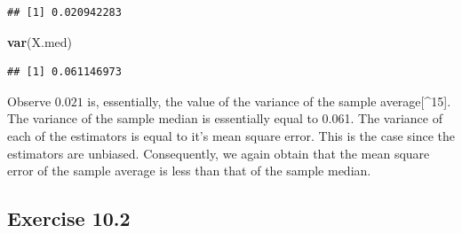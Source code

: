 \documentclass[]{krantz}
\makeatletter
\newenvironment{Shaded}{\begin{snugshade}}{\end{snugshade}}
\newcommand{\KeywordTok}[1]{\textcolor[rgb]{0.13,0.29,0.53}{\textbf{#1}}}
\newcommand{\NormalTok}[1]{#1}
\newenvironment{kframe}{%
\medskip{}
\setlength{\fboxsep}{.8em}
 \def\at@end@of@kframe{}%
 \ifinner\ifhmode%
  \def\at@end@of@kframe{\end{minipage}}%
  \begin{minipage}{\columnwidth}%
 \fi\fi%
 \def\FrameCommand##1{\hskip\@totalleftmargin \hskip-\fboxsep
 \colorbox{shadecolor}{##1}\hskip-\fboxsep
     \hskip-\linewidth \hskip-\@totalleftmargin \hskip\columnwidth}%
 \MakeFramed {\advance\hsize-\width
   \@totalleftmargin\z@ \linewidth\hsize
   \@setminipage}}%
 {\par\unskip\endMakeFramed%
 \at@end@of@kframe}
\renewenvironment{Shaded}{\begin{kframe}}{\end{kframe}}
\theoremstyle{definition}
\theoremstyle{definition}
\theoremstyle{definition}
\theoremstyle{remark}
\makeatother
\begin{document}
\begin{enumerate}
\begin{verbatim}
## [1] 0.020942283
\end{verbatim}

\begin{Shaded}
\begin{Highlighting}[]
\KeywordTok{var}\NormalTok{(X.med)}
\end{Highlighting}
\end{Shaded}

\begin{verbatim}
## [1] 0.061146973
\end{verbatim}

  Observe \(0.021\) is, essentially, the value of the variance of the
  sample average{[}\^{}15{]}. The variance of the sample median is
  essentially equal to 0.061. The variance of each of the estimators is
  equal to it's mean square error. This is the case since the estimators
  are unbiased. Consequently, we again obtain that the mean square error
  of the sample average is less than that of the sample median.
\end{enumerate}

\subsection*{Exercise 10.2}\label{exercise-10.2}
\end{document}
